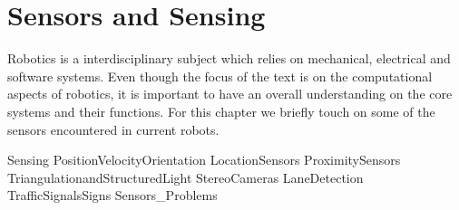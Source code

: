 \hypertarget{Chap:Sensors}{%
\section{Sensors and Sensing}\label{Chap:Sensors}}

Robotics is a interdisciplinary subject which relies on mechanical,
electrical and software systems. Even though the focus of the text is on
the computational aspects of robotics, it is important to have an
overall understanding on the core systems and their functions. For this
chapter we briefly touch on some of the sensors encountered in current
robots.

Sensing PositionVelocityOrientation LocationSensors ProximitySensors
TriangulationandStructuredLight StereoCameras LaneDetection
TrafficSignalsSigns Sensors\_Problems
